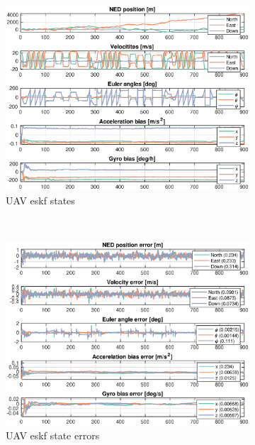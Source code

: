 \begin{figure}[ht]
    \centering
	\begin{subfigure}[b]{0.45\textwidth}
		\includegraphics[width=\textwidth]{figures/ga_2/sim_state}
		\caption{UAV \acrshort{eskf} states}
		\label{fig:ga_2_sim_state}
	\end{subfigure}%
       ~
	\begin{subfigure}[b]{0.45\textwidth}
		\includegraphics[width=\textwidth]{figures/ga_2/sim_errors}
		\caption{UAV \acrshort{eskf} state errors}
		\label{fig:ga_2_sim_errors}
    \end{subfigure}
    \caption{}
    \label{fig:ga_2_sim_state_errors} 
\end{figure}

